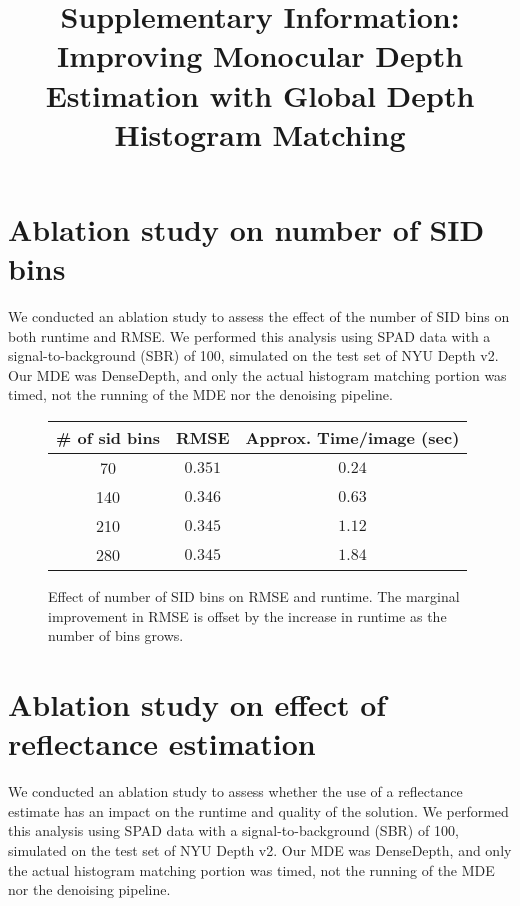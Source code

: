 \documentclass[10pt,letterpaper]{article}
\begin{document}
\title{Supplementary Information: Improving Monocular Depth Estimation with
  Global Depth Histogram Matching}

\maketitle
\section{Ablation study on number of SID bins}
We conducted an ablation study to assess the effect of the number of SID bins
\cite{Fu2018} on both runtime and RMSE. We performed this analysis using SPAD
data with a signal-to-background (SBR) of 100, simulated on the test set of NYU Depth v2. Our
MDE was DenseDepth, and only the actual histogram matching portion 
was timed, not the running of the MDE nor the denoising pipeline.
\begin{figure}[H]
  \centering
  \begin{tabular}{c|cc}
    \toprule
    \# of sid bins & RMSE & Approx. Time/image (sec) \\
    \midrule
    70  & $0.351$ & $0.24$ \\
    140 & $0.346$ & $0.63$ \\
    210 & $0.345$ & $1.12$ \\
    280 & $0.345$ & $1.84$ \\
    \bottomrule
  \end{tabular}
  \caption{Effect of number of SID bins on RMSE and runtime. The marginal
    improvement in RMSE is offset by the increase in runtime as the number of
    bins grows.}
  \label{fig:sid_ablation}
\end{figure}


\section{Ablation study on effect of reflectance estimation}
We conducted an ablation study to assess whether the use of a reflectance
estimate has an impact on the runtime and quality of the solution.
We performed this analysis using SPAD
data with a signal-to-background (SBR) of 100, simulated on the test set of NYU Depth v2. Our
MDE was DenseDepth, and only the actual histogram matching portion 
was timed, not the running of the MDE nor the denoising pipeline.
\end{document}
